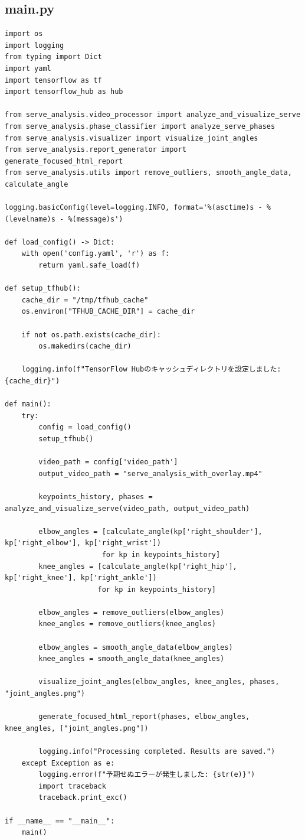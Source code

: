 \documentclass[oneside]{suribt}[11pt]
\begin{document}
\subsection{main.py}
\begin{lstlisting}
import os
import logging
from typing import Dict
import yaml
import tensorflow as tf
import tensorflow_hub as hub

from serve_analysis.video_processor import analyze_and_visualize_serve
from serve_analysis.phase_classifier import analyze_serve_phases
from serve_analysis.visualizer import visualize_joint_angles
from serve_analysis.report_generator import generate_focused_html_report
from serve_analysis.utils import remove_outliers, smooth_angle_data, calculate_angle

logging.basicConfig(level=logging.INFO, format='%(asctime)s - %(levelname)s - %(message)s')

def load_config() -> Dict:
    with open('config.yaml', 'r') as f:
        return yaml.safe_load(f)

def setup_tfhub():
    cache_dir = "/tmp/tfhub_cache"
    os.environ["TFHUB_CACHE_DIR"] = cache_dir
    
    if not os.path.exists(cache_dir):
        os.makedirs(cache_dir)
    
    logging.info(f"TensorFlow Hubのキャッシュディレクトリを設定しました: {cache_dir}")

def main():
    try:
        config = load_config()
        setup_tfhub()
        
        video_path = config['video_path']
        output_video_path = "serve_analysis_with_overlay.mp4"
        
        keypoints_history, phases = analyze_and_visualize_serve(video_path, output_video_path)
        
        elbow_angles = [calculate_angle(kp['right_shoulder'], kp['right_elbow'], kp['right_wrist']) 
                       for kp in keypoints_history]
        knee_angles = [calculate_angle(kp['right_hip'], kp['right_knee'], kp['right_ankle']) 
                      for kp in keypoints_history]
        
        elbow_angles = remove_outliers(elbow_angles)
        knee_angles = remove_outliers(knee_angles)
        
        elbow_angles = smooth_angle_data(elbow_angles)
        knee_angles = smooth_angle_data(knee_angles)
        
        visualize_joint_angles(elbow_angles, knee_angles, phases, "joint_angles.png")
        
        generate_focused_html_report(phases, elbow_angles, knee_angles, ["joint_angles.png"])
        
        logging.info("Processing completed. Results are saved.")
    except Exception as e:
        logging.error(f"予期せぬエラーが発生しました: {str(e)}")
        import traceback
        traceback.print_exc()

if __name__ == "__main__":
    main()
\end{lstlisting}
\end{document}
